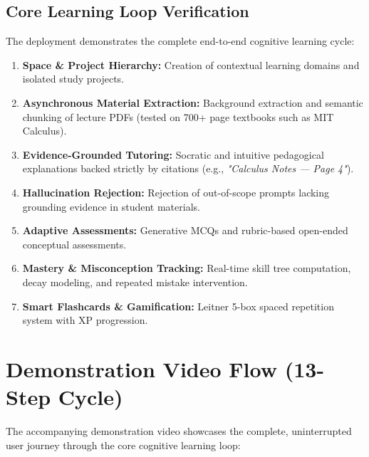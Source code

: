 \documentclass[11pt,a4paper]{article}
\begin{document}
\subsection{Core Learning Loop Verification}
The deployment demonstrates the complete end-to-end cognitive learning cycle:
\begin{enumerate}[noitemsep]
    \item \textbf{Space \& Project Hierarchy:} Creation of contextual learning domains and isolated study projects.
    \item \textbf{Asynchronous Material Extraction:} Background extraction and semantic chunking of lecture PDFs (tested on 700+ page textbooks such as MIT Calculus).
    \item \textbf{Evidence-Grounded Tutoring:} Socratic and intuitive pedagogical explanations backed strictly by citations (e.g., \textit{"Calculus Notes --- Page 4"}).
    \item \textbf{Hallucination Rejection:} Rejection of out-of-scope prompts lacking grounding evidence in student materials.
    \item \textbf{Adaptive Assessments:} Generative MCQs and rubric-based open-ended conceptual assessments.
    \item \textbf{Mastery \& Misconception Tracking:} Real-time skill tree computation, decay modeling, and repeated mistake intervention.
    \item \textbf{Smart Flashcards \& Gamification:} Leitner 5-box spaced repetition system with XP progression.
\end{enumerate}

\section{Demonstration Video Flow (13-Step Cycle)}

The accompanying demonstration video showcases the complete, uninterrupted user journey through the core cognitive learning loop:
\end{document}
